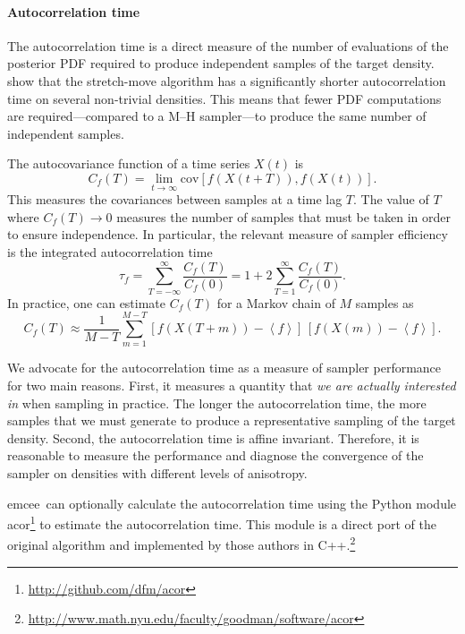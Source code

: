 \documentclass[12pt,preprint]{aastex}
\newcommand{\project}[1]{{\sffamily #1}}
\newcommand{\thisplain}{emcee}
\newcommand{\this}{\project{\thisplain}}
\newcommand{\sectlabel}[1]{\label{sect:#1}}
\renewcommand{\vector}[1]{#1}
\newcommand{\expect}[1]{\left<#1\right>}
\begin{document}
\paragraph{Autocorrelation time} \sectlabel{acor}

The autocorrelation time is a direct measure of the number of evaluations of
the posterior PDF required to produce independent samples of the target
density.  show that the stretch-move algorithm
has a significantly shorter autocorrelation time on several non-trivial
densities. This means that fewer PDF computations are required---compared
to a M--H sampler---to produce the same number of independent samples.

The autocovariance function of a time series $\vector{X} (t)$ is
\begin{equation}
    C_f (T) = \lim_{t \to \infty} \mathrm{cov}
        \left [ f\left (\vector{X}(t+T) \right ),
            f\left (\vector{X}(t) \right ) \right ].
\end{equation}
This measures the covariances between samples at a time lag $T$. The
value of $T$ where $C_f(T) \to 0$ measures the number of samples that
must be taken in order to ensure independence. In particular, the
relevant measure of sampler efficiency is the integrated autocorrelation
time
\begin{equation}
    \tau_f = \sum_{T=-\infty} ^{\infty} \frac{C_f(T)}{C_f(0)}
        = 1+2\sum_{T=1} ^{\infty} \frac{C_f(T)}{C_f(0)}.
\end{equation}
In practice, one can estimate $C_f (T)$ for a Markov chain of $M$ samples as
\begin{equation}
    C_f (T) \approx \frac{1}{M-T} \sum_{m=1}^{M-T}
        \left [ f(X(T+m)) - \expect{f} \right ] \,
        \left [ f(X(m)) - \expect{f} \right ].
\end{equation}

We advocate for the autocorrelation time as a measure of sampler
performance for two main reasons. First, it measures a quantity
that \emph{we are actually interested in} when sampling in practice.
The longer the autocorrelation time, the more samples that we must
generate to produce a representative sampling of the target
density. Second, the autocorrelation time is affine invariant. Therefore,
it is reasonable to measure the performance and diagnose the convergence
of the sampler on densities with different levels of anisotropy.

\this\ can optionally calculate the autocorrelation time using the Python
module \project{acor}\footnote{\url{http://github.com/dfm/acor}} to estimate
the autocorrelation time. This module is a direct port of the original
algorithm  and implemented by those
authors in
C++.\footnote{\url{http://www.math.nyu.edu/faculty/goodman/software/acor}}
\end{document}
